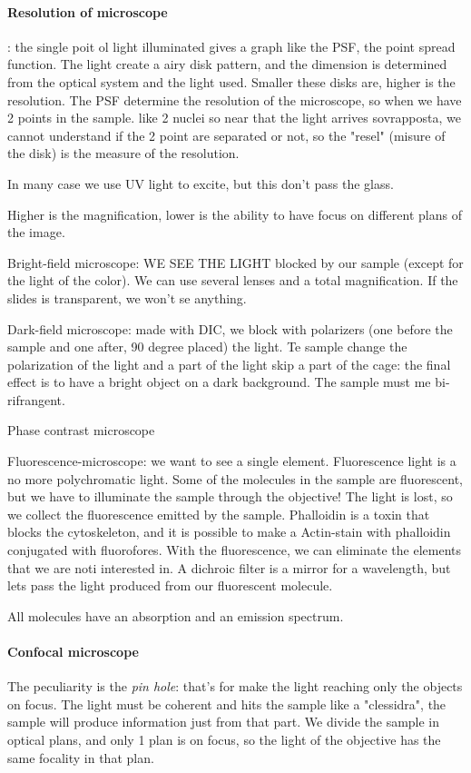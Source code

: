 \documentclass[a4paper, 12pt]{book}
\begin{document}
\paragraph{Resolution of microscope}: the single poit ol light illuminated gives a graph like the PSF, the point spread function. The light create a airy disk pattern, and the dimension is determined from the optical system and the light used. Smaller these disks are, higher is the resolution. The PSF determine the resolution of the microscope, so when we have 2 points in the sample. like 2 nuclei so near that the light arrives sovrapposta, we cannot understand if the 2 point are separated or not, so the "resel" (misure of the disk) is the measure of the resolution.

In many case we use UV light to excite, but this don't pass the glass.

Higher is the magnification, lower is the ability to have focus on different plans of the image.

Bright-field microscope: WE SEE THE LIGHT blocked by our sample (except for the light of the color). We can use several lenses and a total magnification. If the slides is transparent, we won't se anything.

Dark-field microscope: made with DIC, we block with polarizers (one before the sample and one after, 90 degree placed) the light. Te sample change the polarization of the light and a part of the light skip a part of the cage: the final effect is to have a bright object on a dark background. The sample must me bi-rifrangent. 

Phase contrast microscope

Fluorescence-microscope: we want to see a single element. Fluorescence light is a no more polychromatic light. Some of the molecules in the sample are fluorescent, but we have to illuminate the sample through the objective! The light is lost, so we collect the fluorescence emitted by the sample.
Phalloidin is a toxin that blocks the cytoskeleton, and it is possible to make a Actin-stain with phalloidin conjugated with fluorofores. With the fluorescence, we can eliminate the elements that we are noti interested in. A dichroic filter is a mirror for a wavelength, but lets pass the light produced from our fluorescent molecule.

All molecules have an absorption and an emission spectrum.

\paragraph{Confocal microscope}
The peculiarity is the \emph{pin hole}: that's for make the light reaching only the objects on focus. The light must be coherent and hits the sample like a "clessidra", the sample will produce information just from that part. We divide the sample in optical plans, and only 1 plan is on focus, so the light of the objective has the same focality in that plan.
\end{document}
